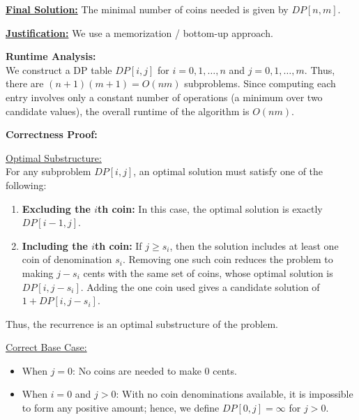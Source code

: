 \documentclass[11pt]{article}
\begin{document}
    \medskip
    
    \underline{\textbf{Final Solution:}} The minimal number of coins needed is given by \(DP[n,m]\).
    
    \medskip
    
    \underline{\textbf{Justification:}} We use a memorization / bottom-up approach. 

    \textbf{Runtime Analysis:} \\
    We construct a DP table \(DP[i,j]\) for \(i=0,1,\dots,n\) and \(j=0,1,\dots,m\). Thus, there are \((n+1)(m+1)=O(nm)\) subproblems. Since computing each entry involves only a constant number of operations (a minimum over two candidate values), the overall runtime of the algorithm is \(O(nm)\).
    
    \bigskip
    
    \textbf{Correctness Proof:}
    
    \underline{Optimal Substructure:} \\
    For any subproblem \(DP[i,j]\), an optimal solution must satisfy one of the following:
    \begin{enumerate}
        \item \textbf{Excluding the \(i\)th coin:} In this case, the optimal solution is exactly \(DP[i-1,j]\).
        \item \textbf{Including the \(i\)th coin:} If \(j \ge s_i\), then the solution includes at least one coin of denomination \(s_i\). Removing one such coin reduces the problem to making \(j-s_i\) cents with the same set of coins, whose optimal solution is \(DP[i,j-s_i]\). Adding the one coin used gives a candidate solution of \(1 + DP[i,j-s_i]\).
    \end{enumerate}
    Thus, the recurrence is an optimal substructure of the problem.
    
    \medskip
    
    \underline{Correct Base Case:} \\
    \begin{itemize}
        \item When \(j=0\): No coins are needed to make 0 cents.
        \item When \(i=0\) and \(j>0\): With no coin denominations available, it is impossible to form any positive amount; hence, we define \(DP[0,j]=\infty\) for \(j>0\).
    \end{itemize}
    
    \newpage

    
    
\end{document}
